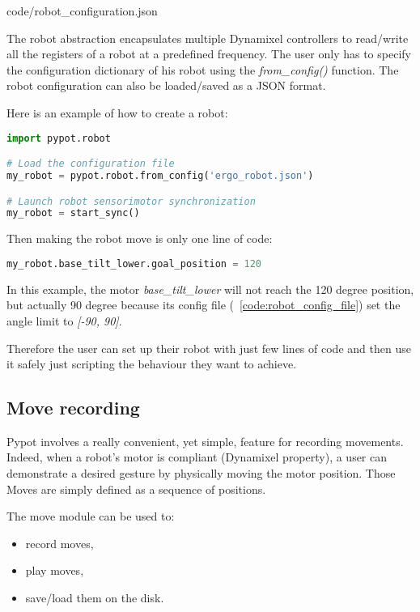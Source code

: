 
    {code/robot_configuration.json}


The robot abstraction encapsulates multiple Dynamixel controllers to read/write all the registers of a robot at a predefined frequency. The user only has to specify the configuration dictionary of his robot using the \emph{from\_config()} function. The robot configuration can also be loaded/saved as a JSON format.

Here is an example of how to create a robot:
\begin{lstlisting}[language = Python]
import pypot.robot

# Load the configuration file
my_robot = pypot.robot.from_config('ergo_robot.json')

# Launch robot sensorimotor synchronization
my_robot = start_sync()
\end{lstlisting}


Then making the robot move is only one line of code:
\begin{lstlisting}[language = Python]
my_robot.base_tilt_lower.goal_position = 120
\end{lstlisting}

In this example, the motor \emph{base\_tilt\_lower} will not reach the 120 degree position, but actually 90 degree because its config file (\codename~\ref{code:robot_config_file}) set the angle limit to \emph{[-90, 90]}.

Therefore the user can set up their robot with just few lines of code and then use it safely just scripting the behaviour they want to achieve.


\subsection{Move recording} %
\label{sub:move_recording}

Pypot involves a really convenient, yet simple, feature for recording movements. Indeed, when a robot's motor is compliant (Dynamixel property), a user can demonstrate a desired gesture by physically moving the motor position. Those Moves are simply defined as a sequence of positions.

The move module can be used to:

\begin{itemize}
    \item record moves,
    \item play moves,
    \item save/load them on the disk.
\end{itemize}

